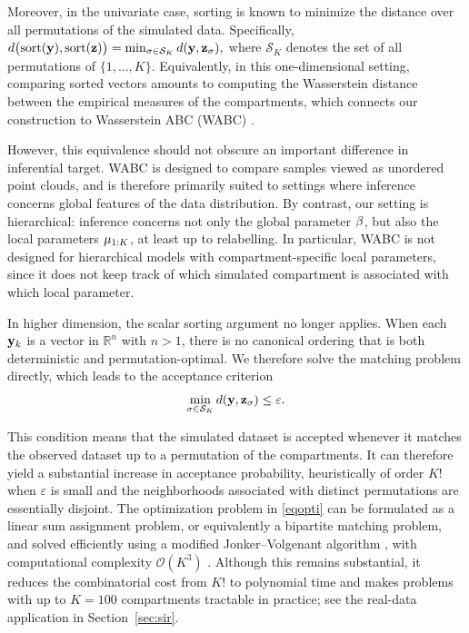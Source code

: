 Moreover, in the univariate case, sorting is known to minimize the distance over all permutations of the simulated data. Specifically, \(
d\bigl(\mathrm{sort}(\mathbf{y}),\mathrm{sort}(\mathbf{z})\bigr)
=
\min_{\sigma\in\mathcal{S}_K} d(\mathbf{y},\mathbf{z}_\sigma),
\)
where $\mathcal{S}_K$ denotes the set of all permutations of $\{1,\dots,K\}$. Equivalently, in this one-dimensional setting, comparing sorted vectors amounts to computing the Wasserstein distance between the empirical measures of the compartments, which connects our construction to Wasserstein ABC (WABC) \citep{bernton2019approximate}.

However, this equivalence should not obscure an important difference in inferential target. WABC is designed to compare samples viewed as unordered point clouds, and is therefore primarily suited to settings where inference concerns global features of the data distribution. By contrast, our setting is hierarchical: inference concerns not only the global parameter \( \beta \), but also the local parameters \( \mu_{1:K} \), at least up to relabelling. In particular, WABC is not designed for hierarchical models with compartment-specific local parameters, since it does not keep track of which simulated compartment is associated with which local parameter.

In higher dimension, the scalar sorting argument no longer applies. When each $\mathbf{y}_k$ is a vector in $\mathbb{R}^n$ with $n>1$, there is no canonical ordering that is both deterministic and permutation-optimal. We therefore solve the matching problem directly, which leads to the acceptance criterion
\begin{equation}
    \label{eqopti}
    \min_{\sigma \in \mathcal{S}_K} d(\mathbf{y},\mathbf{z}_\sigma)\le \varepsilon.
\end{equation}

This condition means that the simulated dataset is accepted whenever it matches the observed dataset up to a permutation of the compartments. It can therefore yield a substantial increase in acceptance probability, heuristically of order $K!$ when $\varepsilon$ is small and the neighborhoods associated with distinct permutations are essentially disjoint. The optimization problem in \eqref{eqopti} can be formulated as a linear sum assignment problem, or equivalently a bipartite matching problem, and solved efficiently using a modified Jonker--Volgenant algorithm \citep{jonker1987shortest}, with computational complexity $\mathcal{O}(K^3)$ \citep{crouseImplementing2DRectangular2016a}. Although this remains substantial, it reduces the combinatorial cost from $K!$ to polynomial time and makes problems with up to $K=100$ compartments tractable in practice; see the real-data application in Section~\ref{sec:sir}.

